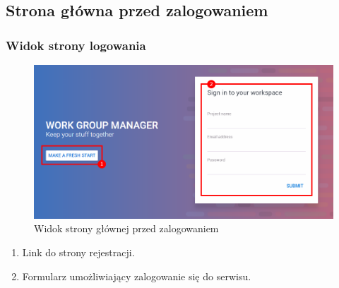 \documentclass[eng,printmode]{mgr}
\begin{document}
\subsection{Strona główna przed zalogowaniem}

\subsubsection{Widok strony logowania}
\begin{figure}[H]
  \begin{center}
  \includegraphics[scale=0.62]{login}
  \end{center}
  \caption{Widok strony głównej przed zalogowaniem}
\end{figure}

\begin{enumerate}
  \item Link do strony rejestracji.
  \item Formularz umożliwiający zalogowanie się do serwisu.
\end{enumerate}
\newpage
\end{document}
